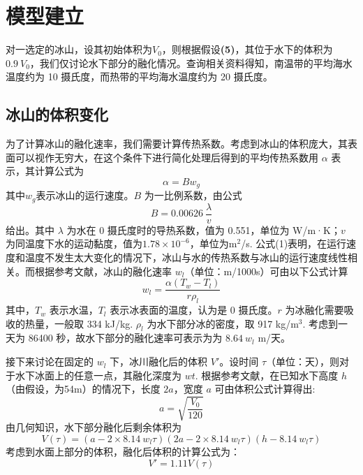 \documentclass[a4paper,12pt,onecolumn,twoside]{article}
\begin{document}
\section{模型建立}
对一选定的冰山，设其初始体积为$V_{0}$，则根据假设\textbf{(5)}，其位于水下的体积为 $0.9~V_{0}$，我们仅讨论水下部分的融化情况。查询相关资料得知，南温带的平均海水温度约为 10 摄氏度，而热带的平均海水温度约为 20 摄氏度。
\subsection{冰山的体积变化}
为了计算冰山的融化速率，我们需要计算传热系数。考虑到冰山的体积庞大，其表面可以视作无穷大，在这个条件下进行简化处理后得到的平均传热系数用 $\alpha$ 表示，其计算公式为
\begin{equation}
	\alpha = Bw_{g}
\end{equation}
其中$w_{g}$表示冰山的运行速度。$B$ 为一比例系数，由公式
\begin{equation}
	B=0.00626~\frac{\lambda}{v}
\end{equation}
给出。其中 $\lambda$ 为水在 0 摄氏度时的导热系数，值为 0.551，单位为 W/m·K；$v$ 为同温度下水的运动黏度，值为$1.78\times10^{-6}$，单位为m$^{2}$/s. 公式(1)表明，在运行速度和温度不发生太大变化的情况下，冰山与水的传热系数与冰山的运行速度线性相关。而根据参考文献，冰山的融化速率 $w_{l}$（单位：m/1000s）可由以下公式计算
\begin{equation}
	w_{l}=\frac{\alpha(T_{w}-T_{l})}{r\rho_{l}}
\end{equation}
其中，$T_{w}$ 表示水温，$T_{l}$ 表示冰表面的温度，认为是 0 摄氏度。$r$ 为冰融化需要吸收的热量，一般取 334 kJ/kg. $\rho_{l}$ 为水下部分冰的密度，取 917 kg/m$^{3}$. 考虑到一天为 86400 秒，故水下部分的融化速率可表示为为 $8.64~w_{l}$ m/天。\par
接下来讨论在固定的 $w_{l}$ 下，冰川融化后的体积 $V\prime$。设时间 $\tau$（单位：天），则对于水下冰面上的任意一点，其融化深度为 $wt$. 根据参考文献\cite{filin2021multi}，在已知水下高度 $h$（由假设，为54m）的情况下，长度 $2a$，宽度 $a$ 可由体积公式计算得出:
\begin{equation}
		a=\sqrt{\frac{V_{0}}{120}}
\end{equation}
由几何知识，水下部分融化后剩余体积为
\begin{equation}
	V(\tau)= (a-2\times8.14~w_{l}\tau)(2a-2\times8.14~w_{l}\tau)(h-8.14~w_{l}\tau)
\end{equation}
考虑到水面上部分的体积，融化后体积的计算公式为：
\begin{equation}
	V\prime=1.11V(\tau)
\end{equation}
\end{document}
